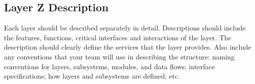\subsection{Layer Z Description}
Each layer should be described separately in detail. Descriptions should include the features, functions, critical interfaces and interactions of the layer. The description should clearly define the services that the layer provides. Also include any conventions that your team will use in describing the structure: naming conventions for layers, subsystems, modules, and data flows; interface specifications; how layers and subsystems are defined; etc. 